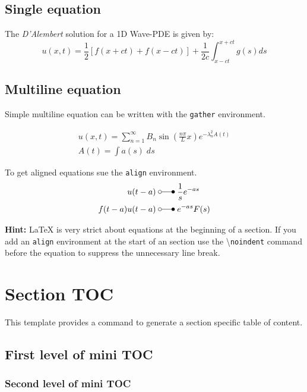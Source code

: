 \documentclass[\fontheight]{extarticle}
\begin{document}
\begin{multicols*}{3}
    \subsection{Single equation}
    The \textit{D'Alembert} solution for a 1D Wave-PDE is given by:
    \begin{equation*}
        u(x,t)=\frac{1}{2}\left[f(x+ct)+f(x-ct)\right]+\frac{1}{2c}\int_{x-ct}^{x+ct}g(s)ds
    \end{equation*}
    
    \subsection{Multiline equation}
    Simple multiline equation can be written with the \texttt{gather} environment.
    
    \begin{gather*}
        u(x,t) =\sum_{n=1}^\infty B_n\sin(\frac{n\pi}Lx)e^{-\lambda_n^2 A(t)} \\
        A(t)=\int a(s)\;ds
    \end{gather*}
    
    To get aligned equations sue the \texttt{align} environment.
    \begin{align*}
        u(t-a)       \; & \laplace\; \frac{1}{s}e^{-as} \\
        f(t-a)u(t-a) \; & \laplace\; e^{-as}F(s)
    \end{align*}
    
    \textbf{Hint:} \LaTeX{} is very strict about equations at the beginning of a section.
    If you add an \texttt{align} environment at the start of an section use the
    \textbackslash{}\texttt{noindent} command before the equation to suppress the unnecessary
    line break.
    
    \section{Section TOC}
    This template provides a command to generate a section specific table of content.
    \createsectiontoc{}
    
    \subsection{First level of mini TOC}
    \subsubsection{Second level of mini TOC}

\end{multicols*}
\end{document}
